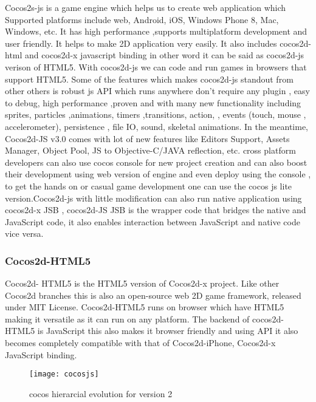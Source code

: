 \documentclass[23pt]{article}
\begin{document}
{\Large Cocos2s-js is a game engine which helps us to create web application which Supported platforms include web, Android, iOS, Windows Phone 8, Mac, Windows, etc.
It has high performance ,supports multiplatform development and user friendly. It helps to make 2D application very easily. It also includes  cocos2d-html and cocos2d-x javascript binding  in other word it can be said as cocos2d-js verison of HTML5. With cocos2d-js we can code and run games in browsers that support HTML5. Some of the features which makes cocos2d-js standout from other others is robust js API which runs anywhere don’t require any plugin , easy to debug, high performance ,proven and with many new functionality including sprites, particles ,animations, timers ,transitions, action, , events (touch, mouse , accelerometer), persistence , file IO, sound, skeletal animations. In the meantime, Cocos2d-JS v3.0 comes with lot of new features like Editors Support, Assets Manager, Object Pool, JS to Objective-C/JAVA reflection, etc. cross platform developers can also use cocos console for new project creation and can also boost their development using web version of engine and even deploy using the console , to get the hands on or casual game development one can use the cocos js lite version.Cocos2d-js with little modification can also run native application using cocos2d-x JSB , cocos2d-JS JSB is the wrapper code that bridges the native  and JavaScript code, it also enables interaction between JavaScript and native code vice versa. \cite{cocosjsback}\\
\par}


\subsubsection{Cocos2d-HTML5 }

{\Large Cocos2d- HTML5 is the HTML5 version of Cocos2d-x project. Like other Cocos2d branches this is also an open-source web 2D game framework, released under MIT License. Cocos2d-HTML5 runs on browser which have HTML5 making it versatile as it can run on any platform. The backend of cocos2d-HTML5 is JavaScript this also makes it browser friendly and using API it also becomes completely compatible with that of Cocos2d-iPhone, Cocos2d-x JavaScript binding. \cite{cocoshtml} \par}

\begin{figure}[h]
\caption{cocos hierarcial evolution for version 2 \cite{architecturejs}}
\centering
\texttt{[image: cocosjs]}
\end{figure}
\end{document}
